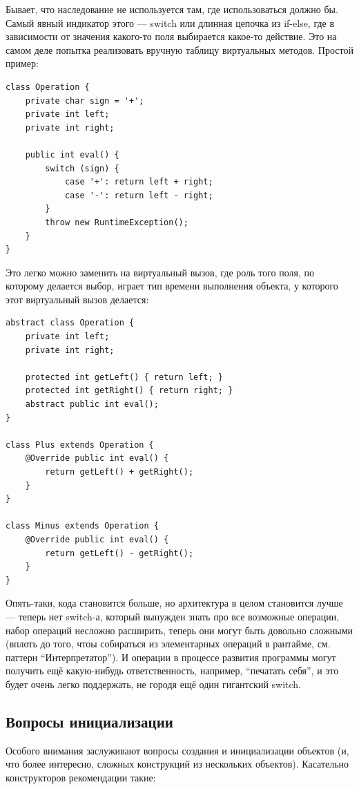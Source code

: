 \documentclass[a5paper]{article}
\begin{document}
Бывает, что наследование не используется там, где использоваться должно бы. Самый явный индикатор этого --- switch или длинная цепочка из if-else, где в зависимости от значения какого-то поля выбирается какое-то действие. Это на самом деле попытка реализовать вручную таблицу виртуальных методов. Простой пример:

\begin{verbatim}
class Operation {
    private char sign = '+';
    private int left;
    private int right;

    public int eval() {
        switch (sign) {
            case '+': return left + right;
            case '-': return left - right;
        }
        throw new RuntimeException();
    }
}
\end{verbatim}

Это легко можно заменить на виртуальный вызов, где роль того поля, по которому делается выбор, играет тип времени выполнения объекта, у которого этот виртуальный вызов делается:

\begin{verbatim}
abstract class Operation {
    private int left;
    private int right;

    protected int getLeft() { return left; }
    protected int getRight() { return right; }
    abstract public int eval();
}

class Plus extends Operation {
    @Override public int eval() { 
        return getLeft() + getRight(); 
    }
}

class Minus extends Operation {
    @Override public int eval() { 
        return getLeft() - getRight(); 
    }
}
\end{verbatim}

Опять-таки, кода становится больше, но архитектура в целом становится лучше --- теперь нет switch-а, который вынужден знать про все возможные операции, набор операций несложно расширить, теперь они могут быть довольно сложными (вплоть до того, чтоы собираться из элементарных операций в рантайме, см. паттерн ``Интерпретатор''). И операции в процессе развития программы могут получить ещё какую-нибудь ответственность, например, ``печатать себя'', и это будет очень легко поддержать, не городя ещё один гигантский switch.

\subsection{Вопросы инициализации}

Особого внимания заслуживают вопросы создания и инициализации объектов (и, что более интересно, сложных конструкций из нескольких объектов). Касательно конструкторов рекомендации такие:
\end{document}
